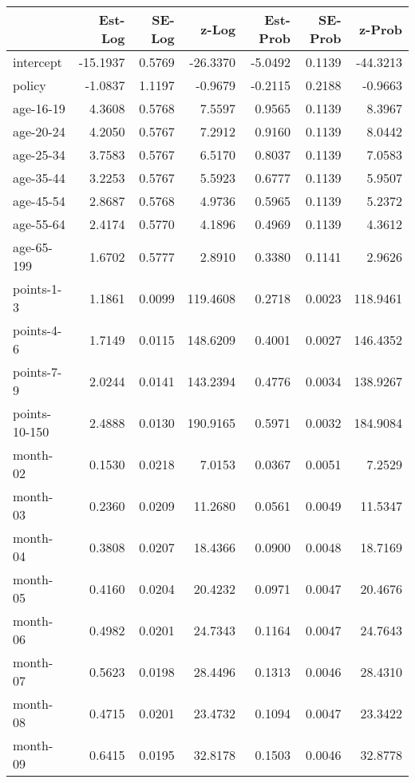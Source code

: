\documentclass[10pt]{article}
\begin{document}
\begin{table}[ht]
\centering
\begin{tabular}{lrrrrrr}
  \hline
 & Est-Log & SE-Log & z-Log & Est-Prob & SE-Prob & z-Prob \\ 
  \hline
intercept & -15.1937 & 0.5769 & -26.3370 & -5.0492 & 0.1139 & -44.3213 \\ 
  policy & -1.0837 & 1.1197 & -0.9679 & -0.2115 & 0.2188 & -0.9663 \\ 
  age-16-19 & 4.3608 & 0.5768 & 7.5597 & 0.9565 & 0.1139 & 8.3967 \\ 
  age-20-24 & 4.2050 & 0.5767 & 7.2912 & 0.9160 & 0.1139 & 8.0442 \\ 
  age-25-34 & 3.7583 & 0.5767 & 6.5170 & 0.8037 & 0.1139 & 7.0583 \\ 
  age-35-44 & 3.2253 & 0.5767 & 5.5923 & 0.6777 & 0.1139 & 5.9507 \\ 
  age-45-54 & 2.8687 & 0.5768 & 4.9736 & 0.5965 & 0.1139 & 5.2372 \\ 
  age-55-64 & 2.4174 & 0.5770 & 4.1896 & 0.4969 & 0.1139 & 4.3612 \\ 
  age-65-199 & 1.6702 & 0.5777 & 2.8910 & 0.3380 & 0.1141 & 2.9626 \\ 
  points-1-3 & 1.1861 & 0.0099 & 119.4608 & 0.2718 & 0.0023 & 118.9461 \\ 
  points-4-6 & 1.7149 & 0.0115 & 148.6209 & 0.4001 & 0.0027 & 146.4352 \\ 
  points-7-9 & 2.0244 & 0.0141 & 143.2394 & 0.4776 & 0.0034 & 138.9267 \\ 
  points-10-150 & 2.4888 & 0.0130 & 190.9165 & 0.5971 & 0.0032 & 184.9084 \\ 
  month-02 & 0.1530 & 0.0218 & 7.0153 & 0.0367 & 0.0051 & 7.2529 \\ 
  month-03 & 0.2360 & 0.0209 & 11.2680 & 0.0561 & 0.0049 & 11.5347 \\ 
  month-04 & 0.3808 & 0.0207 & 18.4366 & 0.0900 & 0.0048 & 18.7169 \\ 
  month-05 & 0.4160 & 0.0204 & 20.4232 & 0.0971 & 0.0047 & 20.4676 \\ 
  month-06 & 0.4982 & 0.0201 & 24.7343 & 0.1164 & 0.0047 & 24.7643 \\ 
  month-07 & 0.5623 & 0.0198 & 28.4496 & 0.1313 & 0.0046 & 28.4310 \\ 
  month-08 & 0.4715 & 0.0201 & 23.4732 & 0.1094 & 0.0047 & 23.3422 \\ 
  month-09 & 0.6415 & 0.0195 & 32.8178 & 0.1503 & 0.0046 & 32.8778 \\ 

\end{tabular}
\end{table}
\end{document}
